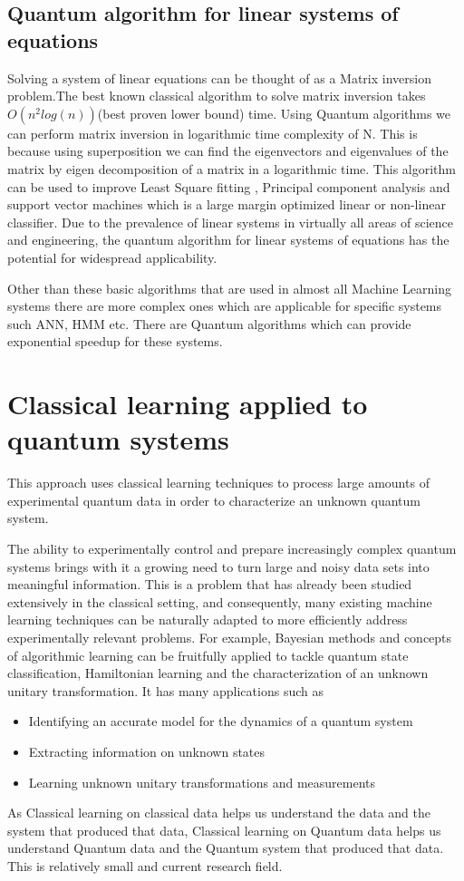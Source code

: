 \subsection{Quantum algorithm for linear systems of equations}
Solving a system of linear equations can be thought of as a Matrix inversion problem.The best known classical algorithm to solve matrix inversion takes $O(n^2log(n))$(best proven lower bound) time. Using Quantum algorithms\cite{matinv} we can perform matrix inversion in logarithmic time complexity of N. This is because using superposition we can find the eigenvectors and eigenvalues of the matrix by eigen decomposition of a matrix in a logarithmic time. This algorithm can be used to improve Least Square fitting , Principal component analysis and support vector machines which is a large margin optimized linear or non-linear classifier.
Due to the prevalence of linear systems in virtually all areas of science and engineering, the quantum algorithm for linear systems of equations has the potential for widespread applicability.\par\bigskip

Other than these basic algorithms that are used in almost all Machine Learning systems there are more complex ones which are applicable for specific systems such ANN, HMM etc. There are Quantum algorithms which can provide exponential speedup for these systems.

\section{Classical learning applied to quantum systems} 
This approach uses classical learning techniques to process large amounts of experimental quantum data in order to characterize an unknown quantum system.\par\bigskip
The ability to experimentally control and prepare increasingly complex quantum systems brings with it a growing need to turn large and noisy data sets into meaningful information. This is a problem that has already been studied extensively in the classical setting, and consequently, many existing machine learning techniques can be naturally adapted to more efficiently address experimentally relevant problems. For example, Bayesian methods and concepts of algorithmic learning can be fruitfully applied to tackle quantum state classification, Hamiltonian learning and the characterization of an unknown unitary transformation.
It has many applications such as 
\begin{itemize}
\item Identifying an accurate model for the dynamics of a quantum system
\item Extracting information on unknown states
\item Learning unknown unitary transformations and measurements
\end{itemize}
As Classical learning on classical data helps us understand the data and the system that produced that data, Classical learning on Quantum data helps us understand Quantum data and the Quantum system that produced that data. 
This is relatively small and current research field. 


